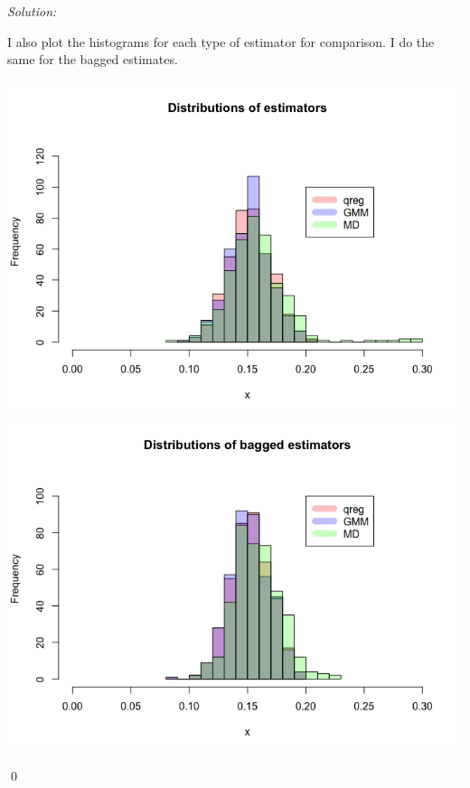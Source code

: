 \documentclass[12pt]{article}
\newenvironment{sol}
    {\emph{Solution:}
    }
    {
    \qed
    }
\begin{document}
\begin{sol}
\begin{enumerate}[label=\alph*) ]
\begin{center}
    \end{center}
    I also plot the histograms for each type of estimator for comparison. I do the same for the bagged estimates.
    \begin{center}
      \includegraphics[scale=0.5]{est_comp.png}
      \includegraphics[scale=0.5]{est_comp_bagged.png}
    \end{center}

  \end{enumerate}
\end{sol}
\end{document}
